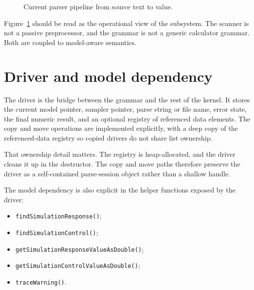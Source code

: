 \begin{figure}[htbp]
\centering
\caption{Current parser pipeline from source text to value.}
\label{fig:parser-pipeline}
\end{figure}

Figure~\ref{fig:parser-pipeline} should be read as the operational view of
the subsystem. The scanner is not a passive preprocessor, and the grammar is
not a generic calculator grammar. Both are coupled to model-aware semantics.

\section{Driver and model dependency}
\label{sec:parser-driver-model}

The driver is the bridge between the grammar and the rest of the kernel. It
stores the current model pointer, sampler pointer, parse string or file name,
error state, the final numeric result, and an optional registry of referenced
data elements. The copy and move operations are implemented explicitly, with a
deep copy of the referenced-data registry so copied drivers do not share list
ownership.

That ownership detail matters. The registry is heap-allocated, and the driver
cleans it up in the destructor. The copy and move paths therefore preserve the
driver as a self-contained parse-session object rather than a shallow handle.

The model dependency is also explicit in the helper functions exposed by the
driver:
\begin{itemize}
\item \texttt{findSimulationResponse()};
\item \texttt{findSimulationControl()};
\item \texttt{getSimulationResponseValueAsDouble()};
\item \texttt{getSimulationControlValueAsDouble()};
\item \texttt{traceWarning()}.
\end{itemize}

